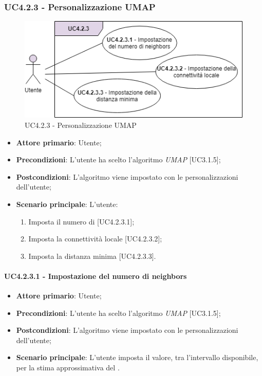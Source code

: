 \subsubsection{UC4.2.3 - Personalizzazione UMAP}
\begin{figure}[h]
\includegraphics[width=13cm]{Section/Images/UC4.2.3.png}
\centering
\caption{UC4.2.3 - Personalizzazione UMAP}
\end{figure}
\begin{itemize}
	\item \textbf{Attore primario}: Utente;
	
	\item \textbf{Precondizioni}: L'utente ha scelto l'algoritmo \textit{UMAP} [UC3.1.5];
	
	\item \textbf{Postcondizioni}: L'algoritmo viene impostato con le personalizzazioni dell'utente;
	
	\item \textbf{Scenario principale}: L'utente:

\begin{enumerate}
\item Imposta il numero di  [UC4.2.3.1];
\item Imposta la connettività locale [UC4.2.3.2];
\item Imposta la distanza minima [UC4.2.3.3].
\end{enumerate}	

\end{itemize}

\paragraph{UC4.2.3.1 - Impostazione del numero di neighbors}
\begin{itemize}
	\item \textbf{Attore primario}: Utente;
	
	\item \textbf{Precondizioni}: L'utente ha scelto l'algoritmo \textit{UMAP} [UC3.1.5];
	
	\item \textbf{Postcondizioni}: L'algoritmo viene impostato con le personalizzazioni dell'utente;
	
	\item \textbf{Scenario principale}: L'utente imposta il valore, tra l'intervallo disponibile, per la stima approssimativa del \textit{}.

\end{itemize}
	
